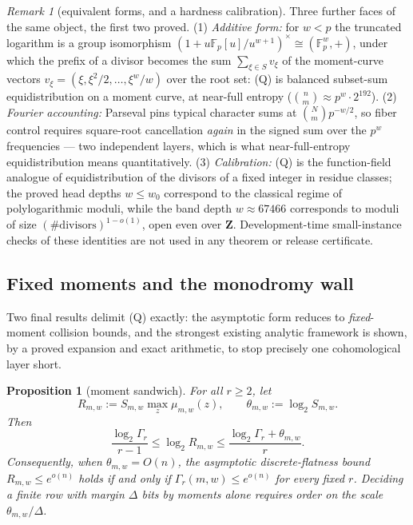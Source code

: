 \documentclass[11pt]{article}
\newtheorem{proposition}[proposition]{Proposition}
\theoremstyle{definition}
\theoremstyle{remark}
\newtheorem{remark}[remark]{Remark}
\newcommand{\F}{\mathbb{F}}
\begin{document}
\begin{remark}[equivalent forms, and a hardness calibration]\label{rem:capfp-Q-forms}
Three further faces of the same object, the first two proved.  \textup{(1)}  \emph{Additive form:} for $w<p$ the truncated logarithm is a group isomorphism $(1+u\F_p[u]/u^{w+1})^\times\cong(\F_p^w,+)$, under which the prefix of a divisor becomes the sum $\sum_{\xi\in S}v_\xi$ of the moment-curve vectors $v_\xi=(\xi,\xi^2/2,\ldots,\xi^w/w)$ over the root set: \textup{(Q)} is balanced subset-sum equidistribution on a moment curve, at near-full entropy \textup($\binom nm\approx p^w\cdot2^{192}$\textup).  \textup{(2)}  \emph{Fourier accounting:} Parseval pins typical character sums at $\binom Nm p^{-w/2}$, so fiber control requires square-root cancellation \emph{again} in the signed sum over the $p^w$ frequencies --- two independent layers, which is what near-full-entropy equidistribution means quantitatively.  \textup{(3)}  \emph{Calibration:} \textup{(Q)} is the function-field analogue of equidistribution of the divisors of a fixed integer in residue classes; the proved head depths $w\le w_0$ correspond to the classical regime of polylogarithmic moduli, while the band depth $w\approx67466$ corresponds to moduli of size $(\#\text{divisors})^{1-o(1)}$, open even over $\mathbf Z$.  Development-time small-instance checks of these identities are not used in any theorem or release certificate.
\end{remark}

\subsection{Fixed moments and the monodromy wall}

Two final results delimit \textup{(Q)} exactly: the asymptotic form reduces to \emph{fixed}-moment collision bounds, and the strongest existing analytic framework is shown, by a proved expansion and exact arithmetic, to stop precisely one cohomological layer short.

\begin{proposition}[moment sandwich]\label{prop:capfp-Q-sandwich}
For all $r\ge2$, let
\[
        R_{m,w}:=S_{m,w}\max_z\mu_{m,w}(z),
        \qquad \theta_{m,w}:=\log_2S_{m,w}.
\]
Then
\[
        \frac{\log_2\Gamma_r}{r-1}
        \le \log_2R_{m,w}
        \le \frac{\log_2\Gamma_r+\theta_{m,w}}{r}.
\]
Consequently, when $\theta_{m,w}=O(n)$, the asymptotic discrete-flatness bound
$R_{m,w}\le e^{o(n)}$ holds if and only if
$\Gamma_r(m,w)\le e^{o(n)}$ for every fixed $r$.  Deciding a finite row with
margin $\Delta$ bits by moments alone requires order on the scale
$\theta_{m,w}/\Delta$.
\end{proposition}
\end{document}
